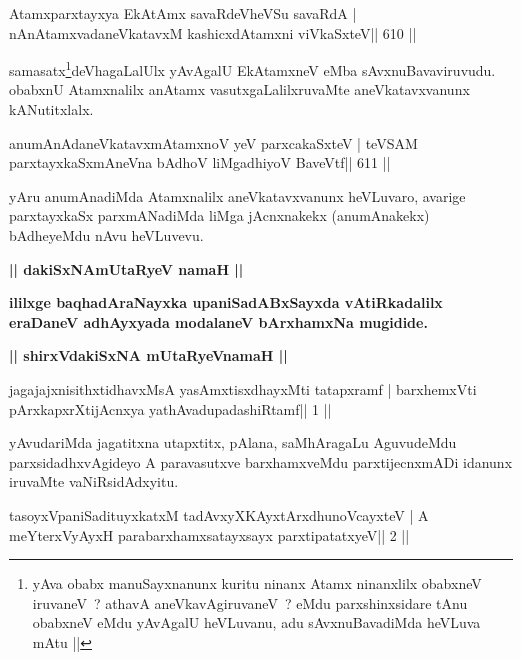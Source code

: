 \begin{shl}
Atamxparxtayxya EkAtAmx savaRdeVheVSu savaRdA |
nAnAtamxvadaneVkatavxM kashicxdAtamxni viVkaSxteV\hfill || 610 ||
\end{shl}

\begin{artha}
samasatx\footnote[1]{yAva obabx manuSayxnanunx kuritu ninanx Atamx   ninanxlilx obabxneV iruvaneV~? athavA aneVkavAgiruvaneV~? eMdu   parxshinxsidare tAnu obabxneV eMdu yAvAgalU heVLuvanu, adu   sAvxnuBavadiMda heVLuva mAtu ||}deVhagaLalUlx yAvAgalU EkAtamxneV eMba sAvxnuBavaviruvudu. obabxnU Atamxnalilx anAtamx vasutxgaLalilxruvaMte aneVkatavxvanunx kANutitxlalx.
\end{artha}

\begin{shl}
anumAnAdaneVkatavxmAtamxnoV yeV parxcakaSxteV |
teVSAM parxtayxkaSxmAneVna bAdhoV liMgadhiyoV BaveVtf\hfill || 611 ||
\end{shl}

\begin{artha}
yAru anumAnadiMda Atamxnalilx aneVkatavxvanunx heVLuvaro, avarige parxtayxkaSx parxmANadiMda liMga jAcnxnakekx (anumAnakekx) bAdheyeMdu nAvu heVLuvevu.
\end{artha}


\begin{center}
{\Large{\textbf{|| dakiSxNAmUtaRyeV namaH ||}}}

{\textbf{ililxge baqhadAraNayxka upaniSadABxSayxda vAtiRkadalilx 
eraDaneV
adhAyxyada modalaneV bArxhamxNa mugidide.}}
\end{center}

\begin{center}
{\large{\textbf{|| shirxVdakiSxNA mUtaRyeVnamaH ||}}}
\end{center}

\begin{shl}
jagajajxnisithxtidhavxMsA yasAmxtisxdhayxMti tatapxramf |
barxhemxVti pArxkapxrXtijAcnxya yathAvadupadashiRtamf\hfill || 1 ||
\end{shl}

\begin{artha}
yAvudariMda jagatitxna utapxtitx, pAlana, saMhAragaLu AguvudeMdu
parxsidadhxvAgideyo A paravasutxve barxhamxveMdu parxtijecnxmADi
idanunx iruvaMte vaNiRsidAdxyitu.
\end{artha}

\begin{shl}
tasoyxVpaniSadituyxkatxM tadAvxyXKAyx\s tArxdhunoVcayxteV |
A meYterxVyAyxH parabarxhamxsatayxsayx parxtipatatxyeV\hfill || 2 ||
\end{shl}

